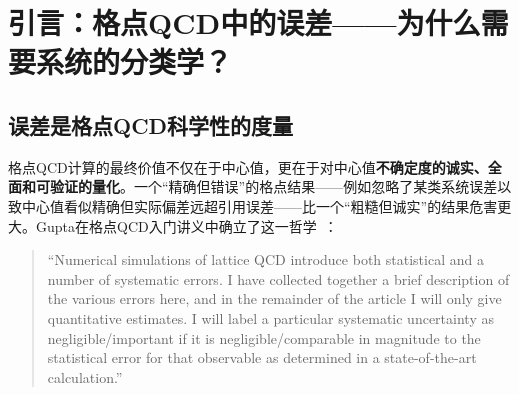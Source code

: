 \documentclass[12pt,a4paper]{ctexart}
\begin{document}
\begin{abstract}
\textbf{第四层——FLAG误差预算的标准格式（§5）：}
以FLAG（Flavour Lattice Averaging Group）的误差报告标准为范例，展示格点QCD结果的标准误差分解格式——中心值$\pm$统计误差$\pm$系统误差（进一步分解为有限体积、离散化、手征外推等子项）。讨论FLAG的``color-coding''质量评估体系——通过星级评定（$\star$到$\star\star\star\star$）来表征对每个系统误差源的控制水平。

\textbf{第五层——误差传播与组合（§6）：}
系统阐述误差从原始格点数据传播到最终物理结果的两条路径：(a) \textbf{全协方差矩阵联合拟合}——利用Bootstrap/Jackknife生成的伪数据集上的全拟合流程，所有误差源被自动纳入；(b) \textbf{顺序外推+独立误差加和}——每个外推维度的误差被独立估计，然后以$\sqrt{\sum_i \sigma_i^2}$的形式按平方相加。讨论两种方法各自的优点、局限和适用场景。

\textbf{第六层——现代格点PDF计算中的误差预算实例（§7）：}
以LPC合作组的核子非极化TMD-PDF~\cite{He2024unpolTMD}和CLQCD/LPC合作组的胶子PDF连续极限计算~\cite{Chen2025gluon}为实例，展示实际的误差分解：大$\lambda$外推系统误差（通过变化$\lambda_L$截断估计）、微扰匹配标度不确定性（通过变化$\mu_R$从$1/\sqrt{2}$到$\sqrt{2}$倍标度估计）、联合外推误差（通过变化外推形式和包含的数据点子集估计）、以及总误差的Bootstrap全协方差估计。
\end{abstract}

\tableofcontents
\newpage

\section{引言：格点QCD中的误差——为什么需要系统的分类学？}

\subsection{误差是格点QCD科学性的度量}

格点QCD计算的最终价值不仅在于中心值，更在于对中心值\textbf{不确定度的诚实、全面和可验证的量化}。一个``精确但错误''的格点结果——例如忽略了某类系统误差以致中心值看似精确但实际偏差远超引用误差——比一个``粗糙但诚实''的结果危害更大。Gupta在格点QCD入门讲义中确立了这一哲学~\cite{Gupta1997intro}：

\begin{quote}
``Numerical simulations of lattice QCD introduce both statistical and a number of systematic errors. I have collected together a brief description of the various errors here, and in the remainder of the article I will only give quantitative estimates. I will label a particular systematic uncertainty as negligible/important if it is negligible/comparable in magnitude to the statistical error for that observable as determined in a state-of-the-art calculation.''
\end{quote}
\end{document}
